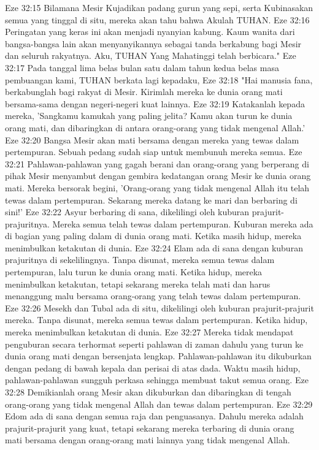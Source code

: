 Eze 32:15  Bilamana Mesir Kujadikan padang gurun yang sepi, serta Kubinasakan semua yang tinggal di situ, mereka akan tahu bahwa Akulah TUHAN.
Eze 32:16  Peringatan yang keras ini akan menjadi nyanyian kabung. Kaum wanita dari bangsa-bangsa lain akan menyanyikannya sebagai tanda berkabung bagi Mesir dan seluruh rakyatnya. Aku, TUHAN Yang Mahatinggi telah berbicara."
Eze 32:17  Pada tanggal lima belas bulan satu dalam tahun kedua belas masa pembuangan kami, TUHAN berkata lagi kepadaku,
Eze 32:18  "Hai manusia fana, berkabunglah bagi rakyat di Mesir. Kirimlah mereka ke dunia orang mati bersama-sama dengan negeri-negeri kuat lainnya.
Eze 32:19  Katakanlah kepada mereka, 'Sangkamu kamukah yang paling jelita? Kamu akan turun ke dunia orang mati, dan dibaringkan di antara orang-orang yang tidak mengenal Allah.'
Eze 32:20  Bangsa Mesir akan mati bersama dengan mereka yang tewas dalam pertempuran. Sebuah pedang sudah siap untuk membunuh mereka semua.
Eze 32:21  Pahlawan-pahlawan yang gagah berani dan orang-orang yang berperang di pihak Mesir menyambut dengan gembira kedatangan orang Mesir ke dunia orang mati. Mereka bersorak begini, 'Orang-orang yang tidak mengenal Allah itu telah tewas dalam pertempuran. Sekarang mereka datang ke mari dan berbaring di sini!'
Eze 32:22  Asyur berbaring di sana, dikelilingi oleh kuburan prajurit-prajuritnya. Mereka semua telah tewas dalam pertempuran. Kuburan mereka ada di bagian yang paling dalam di dunia orang mati. Ketika masih hidup, mereka menimbulkan ketakutan di dunia.
Eze 32:24  Elam ada di sana dengan kuburan prajuritnya di sekelilingnya. Tanpa disunat, mereka semua tewas dalam pertempuran, lalu turun ke dunia orang mati. Ketika hidup, mereka menimbulkan ketakutan, tetapi sekarang mereka telah mati dan harus menanggung malu bersama orang-orang yang telah tewas dalam pertempuran.
Eze 32:26  Mesekh dan Tubal ada di situ, dikelilingi oleh kuburan prajurit-prajurit mereka. Tanpa disunat, mereka semua tewas dalam pertempuran. Ketika hidup, mereka menimbulkan ketakutan di dunia.
Eze 32:27  Mereka tidak mendapat penguburan secara terhormat seperti pahlawan di zaman dahulu yang turun ke dunia orang mati dengan bersenjata lengkap. Pahlawan-pahlawan itu dikuburkan dengan pedang di bawah kepala dan perisai di atas dada. Waktu masih hidup, pahlawan-pahlawan sungguh perkasa sehingga membuat takut semua orang.
Eze 32:28  Demikianlah orang Mesir akan dikuburkan dan dibaringkan di tengah orang-orang yang tidak mengenal Allah dan tewas dalam pertempuran.
Eze 32:29  Edom ada di sana dengan semua raja dan penguasanya. Dahulu mereka adalah prajurit-prajurit yang kuat, tetapi sekarang mereka terbaring di dunia orang mati bersama dengan orang-orang mati lainnya yang tidak mengenal Allah.
